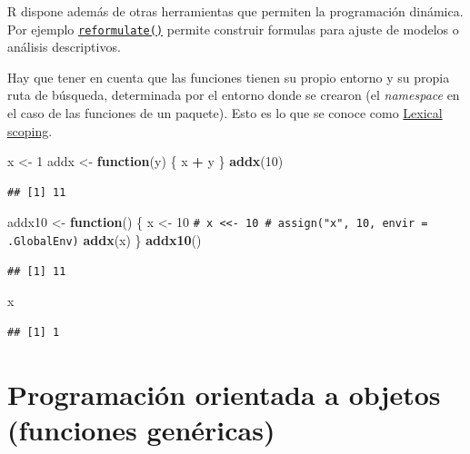 \documentclass[
]{book}
\newenvironment{Shaded}{\begin{snugshade}}{\end{snugshade}}
\newcommand{\CommentTok}[1]{\textcolor[rgb]{0.56,0.35,0.01}{\textit{#1}}}
\newcommand{\ControlFlowTok}[1]{\textcolor[rgb]{0.13,0.29,0.53}{\textbf{#1}}}
\newcommand{\DecValTok}[1]{\textcolor[rgb]{0.00,0.00,0.81}{#1}}
\newcommand{\FunctionTok}[1]{\textcolor[rgb]{0.13,0.29,0.53}{\textbf{#1}}}
\newcommand{\NormalTok}[1]{#1}
\newcommand{\OtherTok}[1]{\textcolor[rgb]{0.56,0.35,0.01}{#1}}
\newcommand{\SpecialCharTok}[1]{\textcolor[rgb]{0.81,0.36,0.00}{\textbf{#1}}}
\theoremstyle{break}
\theoremstyle{nonumberplain}
\renewcommand{\CommentTok}[1]{\textcolor[rgb]{0.41,0.41,0.41}{\texttt{#1}}}
\begin{document}
R dispone además de otras herramientas que permiten la programación dinámica.
Por ejemplo \href{https://rdrr.io/r/stats/delete.response.html}{\texttt{reformulate()}} permite construir formulas para ajuste de modelos o análisis descriptivos.

Hay que tener en cuenta que las funciones tienen su propio entorno y su propia ruta de búsqueda, determinada por el entorno donde se crearon (el \emph{namespace} en el caso de las funciones de un paquete).
Esto es lo que se conoce como \href{https://adv-r.hadley.nz/functions.html\#lexical-scoping}{Lexical scoping}.

\begin{Shaded}
\begin{Highlighting}[]
\NormalTok{x }\OtherTok{\textless{}{-}} \DecValTok{1}
\NormalTok{addx }\OtherTok{\textless{}{-}} \ControlFlowTok{function}\NormalTok{(y) \{}
\NormalTok{  x }\SpecialCharTok{+}\NormalTok{ y}
\NormalTok{\}}
\FunctionTok{addx}\NormalTok{(}\DecValTok{10}\NormalTok{)}
\end{Highlighting}
\end{Shaded}

\begin{verbatim}
## [1] 11
\end{verbatim}

\begin{Shaded}
\begin{Highlighting}[]
\NormalTok{addx10 }\OtherTok{\textless{}{-}} \ControlFlowTok{function}\NormalTok{() \{}
\NormalTok{  x }\OtherTok{\textless{}{-}} \DecValTok{10}   \CommentTok{\# x \textless{}\textless{}{-} 10   \# assign("x", 10, envir = .GlobalEnv)}
  \FunctionTok{addx}\NormalTok{(x)}
\NormalTok{\}}
\FunctionTok{addx10}\NormalTok{()}
\end{Highlighting}
\end{Shaded}

\begin{verbatim}
## [1] 11
\end{verbatim}

\begin{Shaded}
\begin{Highlighting}[]
\NormalTok{x}
\end{Highlighting}
\end{Shaded}

\begin{verbatim}
## [1] 1
\end{verbatim}

\section{Programación orientada a objetos (funciones genéricas)}\label{oop}
\end{document}
